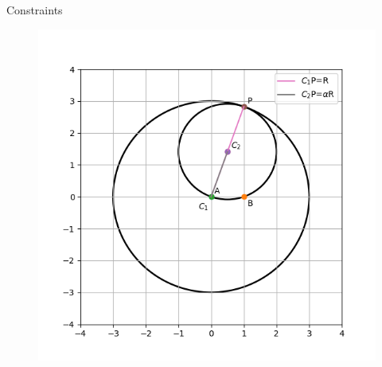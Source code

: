 \documentclass[10pt]{beamer}
\begin{document}
\begin{frame}{Constraints}

\begin{figure}
\centering
\includegraphics[scale = 0.50]{s3_im1_show_constraints.png}

\end{figure}


    
\end{frame}
\end{document}
